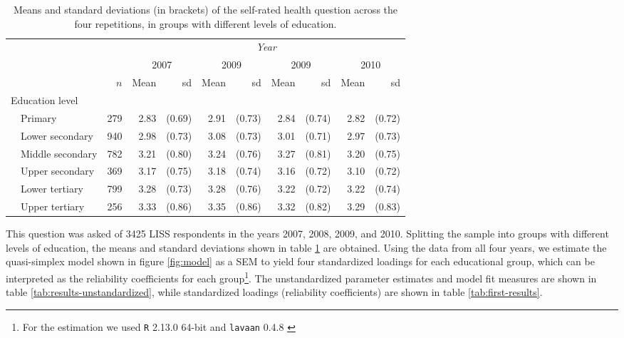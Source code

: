 \documentclass[a4paper, 11pt]{article}
\newcommand{\0}{\boldsymbol{0}}
\newcommand{\R}{\texttt{R} 2.13.0 64-bit \citep{R}\;}
\newcommand{\lavaan}{\texttt{lavaan} 0.4.8 \citep{lavaan}\;}
\begin{document}
\begin{table}[bt]\begin{small}
\begin{center}
\begin{tabular}{llrrrrrrrrr}  \hline  \hline
&&&  \multicolumn{8}{c}{\emph{Year}}\\\cline{4-11}
&&& \multicolumn{2}{c}{2007} & \multicolumn{2}{c}{2009} & \multicolumn{2}{c}{2009} & \multicolumn{2}{c}{2010} \\
&&$n$&Mean&sd&Mean&sd&Mean&sd&Mean&sd\\
  \hline
  \multicolumn{2}{l}{Education level}\\
 
& Primary	  & 279 & 2.83 & (0.69) & 2.91 & (0.73) & 2.84 & (0.74) & 2.82 & (0.72) \\ 
& Lower secondary  & 940 & 2.98 & (0.73) & 3.08 & (0.73) & 3.01 & (0.71) & 2.97 & (0.73) \\ 
& Middle secondary & 782 & 3.21 & (0.80) & 3.24 & (0.76) & 3.27 & (0.81) & 3.20 & (0.75) \\ 
& Upper secondary  & 369 & 3.17 & (0.75) & 3.18 & (0.74) & 3.16 & (0.72) & 3.10 & (0.72) \\ 
& Lower tertiary	  & 799 & 3.28 & (0.73) & 3.28 & (0.76) & 3.22 & (0.72) & 3.22 & (0.74) \\ 
& Upper tertiary	  & 256 & 3.33 & (0.86) & 3.35 & (0.86) & 3.32 & (0.82) & 3.29 & (0.83) \\ 
   \hline
   \hline
\end{tabular}
\caption{Means and standard deviations (in brackets) of the self-rated health question across the four repetitions, in 
groups with different levels of education.}\label{tab:descriptives}
\end{center}\end{small}
\end{table}

This question was asked of 3425 LISS respondents in the years 2007, 2008, 2009, and 2010. Splitting the sample into
groups with different levels of education, the means and standard deviations shown in table \ref{tab:descriptives} are obtained.
Using the data from all four years, we estimate the  quasi-simplex model shown in figure \ref{fig:model} as a SEM
to yield four standardized loadings for each educational group, which can be interpreted as the reliability coefficients for each group\footnote{For the estimation we used \R and \lavaan}. The unstandardized parameter estimates and model fit measures are shown in table \ref{tab:results-unstandardized}, while standardized loadings (reliability coefficients) are shown in table \ref{tab:first-results}.
\end{document}
